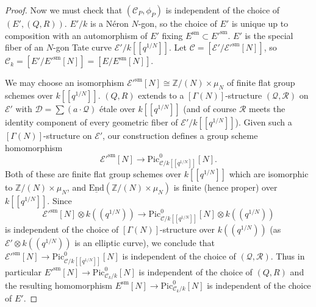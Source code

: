 \documentclass[11pt]{amsart}
\theoremstyle{definition}
\begin{document}
\begin{proof}
Now we must check that $({\mathcal{C}}_P,\phi_P)$ is independent of the choice of $(E',(Q,R))$. $E'/k$ is a N\'eron $N$-gon, so the choice of $E'$ is unique up to composition with an automorphism of $E'$ fixing $E^{\mathrm{sm}} \subset E'^{\mathrm{sm}}$. $E'$ is the special fiber of an $N$-gon Tate curve ${\mathcal{E}}' / k[\![q^{1/N}]\!]$. Let ${\mathcal{C}} = [{\mathcal{E}}'/{\mathcal{E}}'^{\mathrm{sm}}[N]]$, so ${\mathcal{C}}_k = [E'/E'^{\mathrm{sm}}[N]] = [E/E^{\mathrm{sm}}[N]]$. 
\begin{center}
\end{center}
We may choose an isomorphism ${\mathcal{E}}'^{\mathrm{sm}}[N] \cong \mathbb{Z}/(N) \times \mu_N$ of finite flat group schemes over $k[\![q^{1/N}]\!]$. $(Q,R)$ extends to a $[\Gamma(N)]$-structure $({\mathcal{Q}},{\mathcal{R}})$ on ${\mathcal{E}}'$ with ${\mathcal{D}} = \sum (a\cdot {\mathcal{Q}})$ \'etale over $k[\![q^{1/N}]\!]$ (and of course ${\mathcal{R}}$ meets the identity component of every geometric fiber of ${\mathcal{E}}'/ k[\![q^{1/N}]\!]$). Given such a $[\Gamma(N)]$-structure on ${\mathcal{E}}'$, our construction defines a group scheme homomorphism 
\begin{displaymath}
{\mathcal{E}}'^{\mathrm{sm}}[N] \rightarrow \mathrm{Pic}^0_{{\mathcal{C}}/k[\![q^{1/N}]\!]}[N]. 
\end{displaymath}
Both of these are finite flat group schemes over $k[\![q^{1/N}]\!]$ which are isomorphic to $\mathbb{Z}/(N) \times \mu_N$, and $\underline{\mathrm{End}}(\mathbb{Z}/(N) \times \mu_N)$ is finite (hence proper) over $k[\![q^{1/N}]\!]$. Since 
\begin{displaymath}
{\mathcal{E}}'^{\mathrm{sm}}[N] \otimes k((q^{1/N})) \rightarrow \mathrm{Pic}^0_{{\mathcal{C}}/k[\![q^{1/N}]\!]}[N] \otimes k((q^{1/N})) 
\end{displaymath}
is independent of the choice of $[\Gamma(N)]$-structure over $k((q^{1/N}))$ (as ${\mathcal{E}}' \otimes k((q^{1/N}))$ is an elliptic curve), we conclude that ${\mathcal{E}}'^{\mathrm{sm}}[N] \rightarrow \mathrm{Pic}^0_{{\mathcal{C}}/k[\![q^{1/N}]\!]}[N]$ is independent of the choice of $({\mathcal{Q}},{\mathcal{R}})$. Thus in particular $E'^{\mathrm{sm}}[N] \rightarrow \mathrm{Pic}^0_{{\mathcal{C}}_k/k}[N]$ is independent of the choice of $(Q,R)$ and the resulting homomorphism $E^{\mathrm{sm}}[N] \rightarrow \mathrm{Pic}^0_{{\mathcal{C}}_k/k}[N]$ is independent of the choice of $E'$.
\end{proof}
\end{document}
